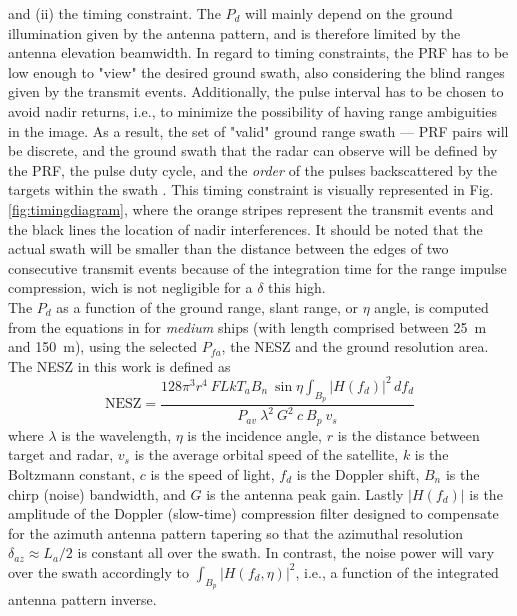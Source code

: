\documentclass[conference,a4paper]{IEEEtran}
\begin{document}
    and (ii) the timing constraint.
    The $P_d$ will mainly depend on the ground illumination given by the antenna pattern, and is therefore limited by the antenna elevation beamwidth.
    In regard to timing constraints, the PRF has to be low enough to "view" the desired ground swath, also considering the blind ranges given by the transmit events.
    Additionally, the pulse interval has to be chosen to avoid nadir returns, i.e., to minimize the possibility of having range ambiguities in the image.
    As a result, the set of "valid" ground range swath --- PRF pairs will be discrete, and the ground swath that the radar can observe will be defined by the PRF, the pulse duty cycle, and the \emph{order} of the pulses backscattered by the targets within the swath \cite{curlander1991synthetic}.
    This timing constraint is visually represented in Fig. \ref{fig:timingdiagram}, where the orange stripes represent the transmit events and the black lines the location of nadir interferences.
    It should be noted that the actual swath will be smaller than the distance between the edges of two consecutive transmit events because of the integration time for the range impulse compression, wich is not negligible for a $\delta$ this high.\\
    The $P_d$ as a function of the ground range, slant range, or $\eta$ angle, is computed from the equations in \cite{DLRjournal} for \emph{medium} ships (with length comprised between 25~m and 150~m), using the selected $P_{fa}$, the NESZ and the ground resolution area.
    The NESZ in this work is defined as
    \begin{equation}
        \text{NESZ} =\dfrac{128 \pi^3 r^4\ F L k T_a B_n\  \sin{\eta}\int_{B_p}\left| H(f_d) \right|^2\, df_d}{P_{av}\  \lambda^2\ G^2\ c\ B_p\ v_s}
        \label{eq:nesz}
    \end{equation}
    where $\lambda$ is the wavelength, $\eta$ is the incidence angle, $r$ is the distance between target and radar, $v_s$ is the average orbital speed of the satellite, $k$ is the Boltzmann constant, $c$ is the speed of light, $f_d$ is the Doppler shift, $B_n$ is the chirp (noise) bandwidth, and $G$ is the antenna peak gain.
    Lastly $|H(f_d)|$ is the amplitude of the Doppler (slow-time) compression filter designed to compensate for the azimuth antenna pattern tapering so that the azimuthal resolution $\delta_{az}\approx L_a/2$ is constant all over the swath.
    In contrast, the noise power will vary over the swath accordingly to $\int_{B_{p}}|H(f_d, \eta)|^2$, i.e., a function of the integrated antenna pattern inverse.
\end{document}
